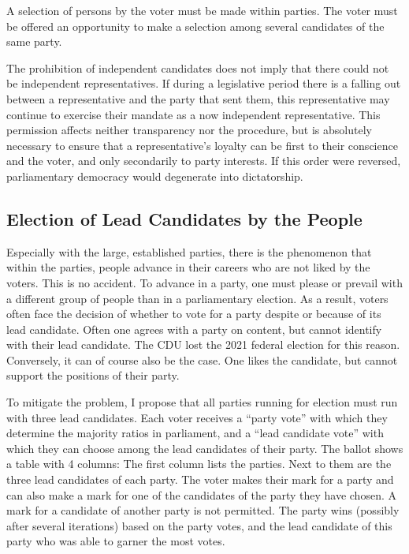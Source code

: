 
A selection of persons by the voter must be made within parties. The
voter must be offered an opportunity to make a selection among several candidates of the same party.


The prohibition of independent candidates does not imply that there could not be independent representatives.
If during a legislative period there is a falling out between a representative
and the party that sent them, this representative may continue to exercise their mandate as a now
independent representative. This permission affects neither transparency nor the
procedure, but is absolutely necessary to ensure that a representative's loyalty
can be first to their conscience and the voter, and only secondarily to party interests.
If this order were reversed, parliamentary democracy would degenerate into
dictatorship.

\subsection{Election of Lead Candidates by the People}

Especially with the large, established parties, there is the phenomenon that within the
parties, people advance in their careers who are not liked by the voters. This is no accident. To
advance in a party, one must please or prevail with a different group of people
than in a parliamentary election. As a result, voters often face
the decision of whether to vote for a party despite or because of its lead candidate. Often
one agrees with a party on content, but cannot identify with their
lead candidate. The CDU lost the 2021 federal election for this reason. Conversely,
it can of course also be the case. One likes the candidate, but cannot support the positions of their party.

To mitigate the problem, I propose that all parties running for election must
run with three lead candidates. Each voter receives a \enquote{party vote} with
which they determine the majority ratios in parliament, and a
\enquote{lead candidate vote} with which they can choose among the lead candidates of their party.
The ballot shows a table with 4 columns: The first column lists the
parties. Next to them are the three lead candidates of each party. The voter makes their
mark for a party and can also make a mark for one of the candidates of the party they have chosen.
A mark for a candidate of another party is not permitted. The party wins
(possibly after several iterations) based on the party votes, and the lead candidate
of this party who was able to garner the most votes.

